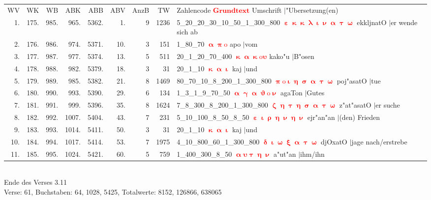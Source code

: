 \documentclass[a4paper,10pt,landscape]{article}
\begin{document}
\begin{tabular}{rrrrrrrrp{120mm}}
WV&WK&WB&ABK&ABB&ABV&AnzB&TW&Zahlencode \textcolor{red}{$\boldsymbol{Grundtext}$} Umschrift $|$"Ubersetzung(en)\\
1.&175.&985.&965.&5362.&1.&9&1236&5\_20\_20\_30\_10\_50\_1\_300\_800 \textcolor{red}{$\boldsymbol{\upepsilon\upkappa\upkappa\uplambda\upiota\upnu\upalpha\uptau\upomega}$} ekkljnatO $|$er wende sich ab\\
2.&176.&986.&974.&5371.&10.&3&151&1\_80\_70 \textcolor{red}{$\boldsymbol{\upalpha\uppi\mathrm{o}}$} apo $|$vom\\
3.&177.&987.&977.&5374.&13.&5&511&20\_1\_20\_70\_400 \textcolor{red}{$\boldsymbol{\upkappa\upalpha\upkappa\mathrm{o}\upsilon}$} kako"u $|$B"osen\\
4.&178.&988.&982.&5379.&18.&3&31&20\_1\_10 \textcolor{red}{$\boldsymbol{\upkappa\upalpha\upiota}$} kaj $|$und\\
5.&179.&989.&985.&5382.&21.&8&1469&80\_70\_10\_8\_200\_1\_300\_800 \textcolor{red}{$\boldsymbol{\uppi\mathrm{o}\upiota\upeta\upsigma\upalpha\uptau\upomega}$} poj"asatO $|$tue\\
6.&180.&990.&993.&5390.&29.&6&134&1\_3\_1\_9\_70\_50 \textcolor{red}{$\boldsymbol{\upalpha\upgamma\upalpha\upvartheta\mathrm{o}\upnu}$} agaTon $|$Gutes\\
7.&181.&991.&999.&5396.&35.&8&1624&7\_8\_300\_8\_200\_1\_300\_800 \textcolor{red}{$\boldsymbol{\upzeta\upeta\uptau\upeta\upsigma\upalpha\uptau\upomega}$} z"at"asatO $|$er suche\\
8.&182.&992.&1007.&5404.&43.&7&231&5\_10\_100\_8\_50\_8\_50 \textcolor{red}{$\boldsymbol{\upepsilon\upiota\uprho\upeta\upnu\upeta\upnu}$} ejr"an"an $|$(den) Frieden\\
9.&183.&993.&1014.&5411.&50.&3&31&20\_1\_10 \textcolor{red}{$\boldsymbol{\upkappa\upalpha\upiota}$} kaj $|$und\\
10.&184.&994.&1017.&5414.&53.&7&1975&4\_10\_800\_60\_1\_300\_800 \textcolor{red}{$\boldsymbol{\updelta\upiota\upomega\upxi\upalpha\uptau\upomega}$} djOxatO $|$jage nach/erstrebe\\
11.&185.&995.&1024.&5421.&60.&5&759&1\_400\_300\_8\_50 \textcolor{red}{$\boldsymbol{\upalpha\upsilon\uptau\upeta\upnu}$} a"ut"an $|$ihm/ihn\\
\end{tabular}\medskip \\
Ende des Verses 3.11\\
Verse: 61, Buchstaben: 64, 1028, 5425, Totalwerte: 8152, 126866, 638065\\
\end{document}
